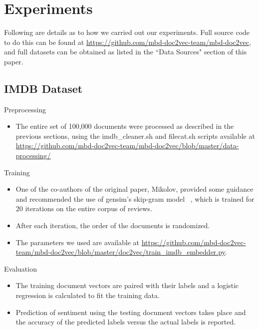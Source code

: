 \documentclass[11pt]{article}
\begin{document}
\section*{Experiments}
Following are details as to how we carried out our experiments.
Full source code to do this can be found at
\url{https://github.com/mbd-doc2vec-team/mbd-doc2vec}, and full datasets
can be obtained as listed in the ``Data Sources" section of this paper.

\subsection*{IMDB Dataset}
\let\oldlabelitemi=\labelitemi
\renewcommand\labelitemi{{\boldmath$\cdot$}}
\begin{description}
  \item Preprocessing
    \begin{itemize}
      \item The entire set of 100,000 documents were processed as described
            in the previous sections, using the imdb\_cleaner.sh and filecat.sh
            scripts available at \url{https://github.com/mbd-doc2vec-team/mbd-doc2vec/blob/master/data-processing/}
    \end{itemize}
  \item Training
    \begin{itemize}
      \item One of the co-authors of the original paper, Mikolov, provided
            some guidance and recommended the use of gensim's skip-gram model
            ~\cite{gensim}, which is trained for 20 iterations on the entire
            corpus of reviews.
      \item After each iteration, the order of the documents is randomized.
      \item The parameters we used are available at \url{https://github.com/mbd-doc2vec-team/mbd-doc2vec/blob/master/doc2vec/train_imdb_embedder.py}.
    \end{itemize}
  \item Evaluation
    \begin{itemize}
      \item The training document vectors are paired with their labels and
            a logistic regression is calculated to fit the training data.
      \item Prediction of sentiment using the testing document vectors takes
            place and the accuracy of the predicted labels versus the actual
            labels is reported.
    \end{itemize}
\end{description}
\end{document}

